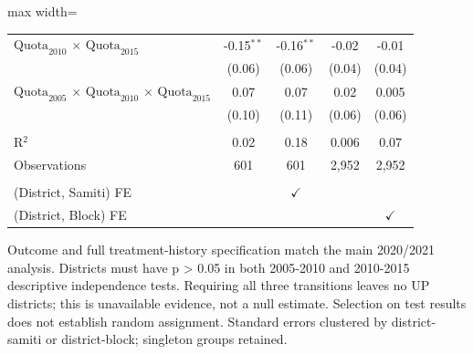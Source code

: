 \begin{adjustbox}{max width=\linewidth}
\begin{threeparttable}[b]
\begin{tabular}{lcccc}
         $\text{Quota}_{2010}$ $\times$ $\text{Quota}_{2015}$                                     & -0.15$^{**}$ & -0.16$^{**}$  & -0.02        & -0.01\\   
                                                                                                  & (0.06)       & (0.06)        & (0.04)       & (0.04)\\   
         $\text{Quota}_{2005}$ $\times$ $\text{Quota}_{2010}$ $\times$ $\text{Quota}_{2015}$      & 0.07         & 0.07          & 0.02         & 0.005\\   
                                                                                                  & (0.10)       & (0.11)        & (0.06)       & (0.06)\\   
          \\
         R$^2$                                                                                    & 0.02         & 0.18          & 0.006        & 0.07\\  
         Observations                                                                             & 601          & 601           & 2,952        & 2,952\\  
          \\
         (District, Samiti) FE                                                                    &              & $\checkmark$  &              & \\  
         (District, Block) FE                                                                     &              &               &              & $\checkmark$\\   
         \bottomrule
      \end{tabular}
      
      \begin{tablenotes}
         \item Outcome and full treatment-history specification match the main 2020/2021 analysis. Districts must have p > 0.05 in both 2005-2010 and 2010-2015 descriptive independence tests. Requiring all three transitions leaves no UP districts; this is unavailable evidence, not a null estimate. Selection on test results does not establish random assignment. Standard errors clustered by district-samiti or district-block; singleton groups retained.
      \end{tablenotes}
   \end{threeparttable}
\end{adjustbox}
\par\endgroup


